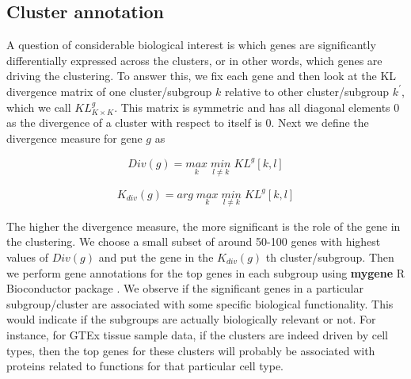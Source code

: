 \subsection{Cluster annotation}

A question of considerable biological interest is which genes are significantly differentially expressed across the clusters, or in other words, which genes are driving the clustering. To answer this, we fix each gene and then look at the KL divergence matrix of one cluster/subgroup $k$ relative to other cluster/subgroup $k^{'}$, which we call $KL^{g}_{K \times K}$. This matrix is symmetric and has all diagonal elements $0$ as the divergence of a cluster with respect to itself is $0$. Next we define the divergence measure for gene $g$ as 

$$ Div(g) = \underset{k}{max} \; \underset{l \neq k}{min} \; KL^{g} [k, l] $$

$$ K_{div}(g) = arg \;  \underset{k}{max} \; \underset{l \neq k}{min}  \; KL^{g} [k, l] $$


The higher the divergence measure, the more significant is the role of the gene in the clustering. We choose a small subset of around 50-100 genes with highest values of $Div(g)$ and put the gene in the $K_{div}(g)$ th cluster/subgroup. Then we perform gene annotations for the top genes in each subgroup using \textbf{mygene} R Bioconductor package \cite{Thompson2014}. We observe if the significant genes in a particular subgroup/cluster are associated with some specific biological functionality. This would indicate if the subgroups are actually biologically relevant or not. For instance, for GTEx tissue sample data, if the clusters are indeed driven by cell types, then the top genes for these clusters will probably be associated with proteins related to  functions for that particular cell type.


\medskip
















 









